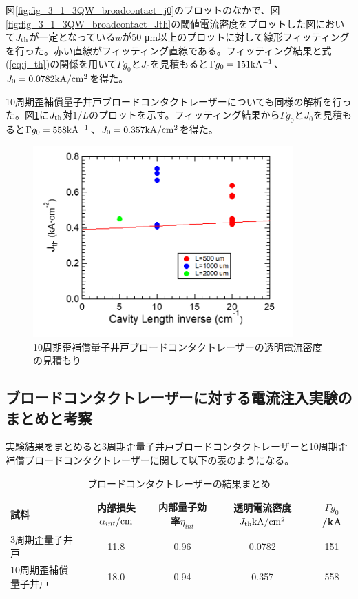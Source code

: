 {図\ref{fig:fig_3_1_3QW_broadcontact_j0}のプロットのなかで、図\ref{fig:fig_3_1_3QW_broadcontact_Jth}の閾値電流密度をプロットした図において$J_{\rm{th}}$が一定となっている$w$が50 \si{\micro\metre}以上のプロットに対して線形フィッティングを行った。赤い直線がフィッティング直線である。フィッティング結果と式(\ref{eq:j_th})の関係を用いて$\Gamma g_{0}$と$J_{0}$を見積もると$\Gamma g_{0}=151 \rm{ kA^{-1}}$、$J_{0}=0.0782 \rm{kA/cm^{2}}$を得た。


10周期歪補償量子井戸ブロードコンタクトレーザーについても同様の解析を行った。図\ref{fig:fig_3_1_10QW_broadcontact_j0}に$J_{\rm{th}}$対$1/L$のプロットを示す。フィッティング結果から$\Gamma g_{0}$と$J_{0}$を見積もると$\Gamma g_{0}=558   \rm{kA^{-1}}$、$J_{0}=0.357 \rm{kA/cm^{2}}$を得た。
\begin{figure}[t]
	\centering
	\includegraphics[width=10cm]{figure/fig_3_1_10QW_broadcontact_j0.png}
	\caption{10周期歪補償量子井戸ブロードコンタクトレーザーの透明電流密度の見積もり}
	\label{fig:fig_3_1_10QW_broadcontact_j0}
\end{figure}
\newpage
\subsection{ブロードコンタクトレーザーに対する電流注入実験のまとめと考察}

実験結果をまとめると3周期歪量子井戸ブロードコンタクトレーザーと10周期歪補償ブロードコンタクトレーザーに関して以下の表のようになる。
\begin{table}[h]
  \caption{ブロードコンタクトレーザーの結果まとめ}
  \label{table:table_I0}
  \centering
  \begin{tabular}{lcccc}
    \hline
    試料   &  内部損失$\alpha_{int} \rm{ /cm}$&内部量子効率$\eta_{int} $&透明電流密度 $J_{\rm{th}} \rm{ kA/cm^2}$  &$\Gamma g_{0}$ /kA\\
    \hline \hline
     3周期歪量子井戸 &   11.8 &0.96&0.0782 & 151\\
    10周期歪補償量子井戸  & 18.0 &0.94&0.357&558\\
    \hline
  \end{tabular}
\end{table}

}
